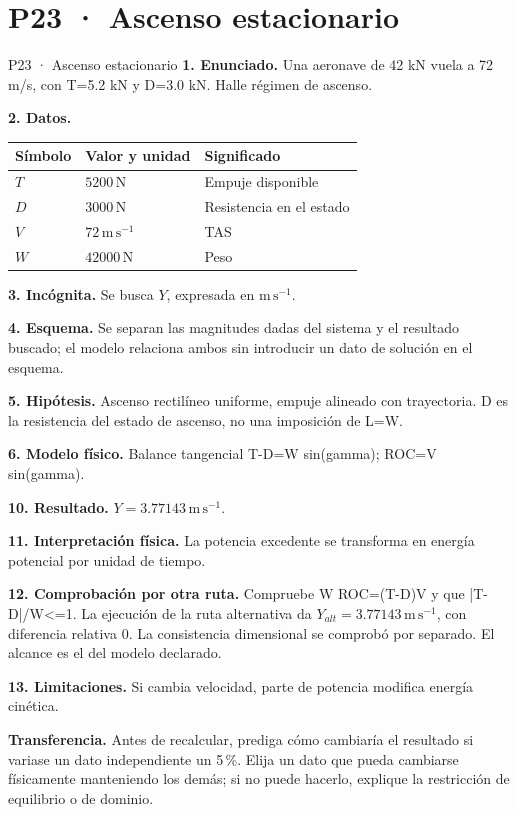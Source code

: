 \chapter*{P23 · Ascenso estacionario}
\begin{studiumworked}{P23 · Ascenso estacionario}
\textbf{1. Enunciado.} Una aeronave de 42 kN vuela a 72 m/s, con T=5.2 kN y D=3.0 kN. Halle régimen de ascenso.

\textbf{2. Datos.}
\begin{longtable}{p{.16\linewidth}p{.35\linewidth}p{.38\linewidth}}\toprule Símbolo & Valor y unidad & Significado\\\midrule\endhead
$T$ & $5200\,\mathrm N$ & Empuje disponible\\
$D$ & $3000\,\mathrm N$ & Resistencia en el estado\\
$V$ & $72\,\mathrm{m\,s^{-1}}$ & TAS\\
$W$ & $42000\,\mathrm N$ & Peso\\
\bottomrule\end{longtable}
\textbf{3. Incógnita.} Se busca $Y$, expresada en $\mathrm{m\,s^{-1}}$.

\textbf{4. Esquema.} Se separan las magnitudes dadas del sistema y el resultado buscado; el modelo relaciona ambos sin introducir un dato de solución en el esquema.

\textbf{5. Hipótesis.} Ascenso rectilíneo uniforme, empuje alineado con trayectoria. D es la resistencia del estado de ascenso, no una imposición de L=W.

\textbf{6. Modelo físico.} Balance tangencial T-D=W sin(gamma); ROC=V sin(gamma).


\textbf{10. Resultado.} $Y=3.77143\,\mathrm{m\,s^{-1}}$.

\textbf{11. Interpretación física.} La potencia excedente se transforma en energía potencial por unidad de tiempo.

\textbf{12. Comprobación por otra ruta.} Compruebe W ROC=(T-D)V y que |T-D|/W<=1. La ejecución de la ruta alternativa da $Y_{alt}=3.77143\,\mathrm{m\,s^{-1}}$, con diferencia relativa $0$. La consistencia dimensional se comprobó por separado. El alcance es el del modelo declarado.

\textbf{13. Limitaciones.} Si cambia velocidad, parte de potencia modifica energía cinética.

\textbf{Transferencia.} Antes de recalcular, prediga cómo cambiaría el resultado si variase un dato independiente un 5\,\%. Elija un dato que pueda cambiarse físicamente manteniendo los demás; si no puede hacerlo, explique la restricción de equilibrio o de dominio.\par
\end{studiumworked}
